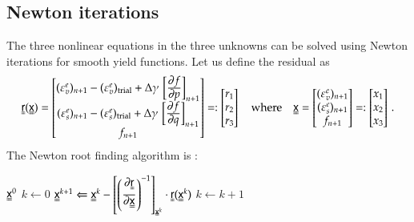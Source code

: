 \documentclass[twoside,10pt,a4paper]{article}
\begin{document}
\subsection{Newton iterations}
The three nonlinear equations in the three unknowns can be solved using Newton iterations
for smooth yield functions.  Let us define the residual as
\[
   \Mr(\Mx) = \begin{bmatrix} 
    (\Ve_v^e)_{n+1} -  (\Ve_v^e)_\Trial + \Delta\gamma\,\left[\Partial{f}{p}\right]_{n+1} \\
    (\Ve_s^e)_{n+1} -  (\Ve_s^e)_\Trial + \Delta\gamma\,\left[\Partial{f}{q}\right]_{n+1} \\
    f_{n+1} \end{bmatrix} =: \begin{bmatrix} r_1 \\ r_2 \\ r_3 \end{bmatrix}
   \quad \text{where} \quad
   \Mx = \begin{bmatrix} (\Ve_v^e)_{n+1} \\ (\Ve_s^e)_{n+1} \\ f_{n+1} \end{bmatrix} 
        =: \begin{bmatrix} x_1 \\ x_2 \\ x_3 \end{bmatrix} \,.
\]
The Newton root finding algorithm is :
\begin{algorithm}
  \begin{algorithmic}
    \REQUIRE $\Mx^0$
    \STATE $k \leftarrow 0$
      \STATE $\Mx^{k+1} \Leftarrow \Mx^k - \left[\left(\Partial{\Mr}{\Mx}\right)^{-1}\right]_{\Mx^k}\cdot
              \Mr(\Mx^k)$
      \STATE $k \leftarrow k+1$
    \ENDWHILE
  \end{algorithmic}
\end{algorithm}
\end{document}
